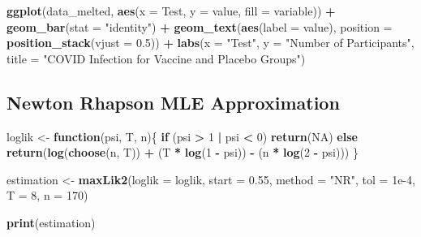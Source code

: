 \documentclass[
  11pt,
]{article}
\newenvironment{Shaded}{\begin{snugshade}}{\end{snugshade}}
\newcommand{\AttributeTok}[1]{\textcolor[rgb]{0.13,0.29,0.53}{#1}}
\newcommand{\ConstantTok}[1]{\textcolor[rgb]{0.56,0.35,0.01}{#1}}
\newcommand{\ControlFlowTok}[1]{\textcolor[rgb]{0.13,0.29,0.53}{\textbf{#1}}}
\newcommand{\DecValTok}[1]{\textcolor[rgb]{0.00,0.00,0.81}{#1}}
\newcommand{\FloatTok}[1]{\textcolor[rgb]{0.00,0.00,0.81}{#1}}
\newcommand{\FunctionTok}[1]{\textcolor[rgb]{0.13,0.29,0.53}{\textbf{#1}}}
\newcommand{\NormalTok}[1]{#1}
\newcommand{\OtherTok}[1]{\textcolor[rgb]{0.56,0.35,0.01}{#1}}
\newcommand{\SpecialCharTok}[1]{\textcolor[rgb]{0.81,0.36,0.00}{\textbf{#1}}}
\newcommand{\StringTok}[1]{\textcolor[rgb]{0.31,0.60,0.02}{#1}}
\begin{document}
\begin{Shaded}
\begin{Highlighting}[]
\FunctionTok{ggplot}\NormalTok{(data\_melted, }\FunctionTok{aes}\NormalTok{(}\AttributeTok{x =}\NormalTok{ Test, }\AttributeTok{y =}\NormalTok{ value, }\AttributeTok{fill =}\NormalTok{ variable)) }\SpecialCharTok{+}
  \FunctionTok{geom\_bar}\NormalTok{(}\AttributeTok{stat =} \StringTok{"identity"}\NormalTok{) }\SpecialCharTok{+}
  \FunctionTok{geom\_text}\NormalTok{(}\FunctionTok{aes}\NormalTok{(}\AttributeTok{label =}\NormalTok{ value), }
            \AttributeTok{position =} \FunctionTok{position\_stack}\NormalTok{(}\AttributeTok{vjust =} \FloatTok{0.5}\NormalTok{)) }\SpecialCharTok{+}
  \FunctionTok{labs}\NormalTok{(}\AttributeTok{x =} \StringTok{"Test"}\NormalTok{, }\AttributeTok{y =} \StringTok{"Number of Participants"}\NormalTok{, }
       \AttributeTok{title =} \StringTok{"COVID Infection for Vaccine and Placebo Groups"}\NormalTok{) }
\end{Highlighting}
\end{Shaded}

\hypertarget{newton-rhapson-mle-approximation}{%
\subsection{Newton Rhapson MLE
Approximation}\label{newton-rhapson-mle-approximation}}

\begin{Shaded}
\begin{Highlighting}[]
\NormalTok{loglik }\OtherTok{\textless{}{-}} \ControlFlowTok{function}\NormalTok{(psi, T, n)\{}
  \ControlFlowTok{if}\NormalTok{ (psi }\SpecialCharTok{\textgreater{}} \DecValTok{1} \SpecialCharTok{|}\NormalTok{ psi }\SpecialCharTok{\textless{}} \DecValTok{0}\NormalTok{) }
    \FunctionTok{return}\NormalTok{(}\ConstantTok{NA}\NormalTok{)}
  \ControlFlowTok{else}
    \FunctionTok{return}\NormalTok{(}\FunctionTok{log}\NormalTok{(}\FunctionTok{choose}\NormalTok{(n, T)) }\SpecialCharTok{+}\NormalTok{ (T }\SpecialCharTok{*} \FunctionTok{log}\NormalTok{(}\DecValTok{1} \SpecialCharTok{{-}}\NormalTok{ psi)) }\SpecialCharTok{{-}}\NormalTok{ (n }\SpecialCharTok{*} \FunctionTok{log}\NormalTok{(}\DecValTok{2} \SpecialCharTok{{-}}\NormalTok{ psi)))}
\NormalTok{\}}

\NormalTok{estimation }\OtherTok{\textless{}{-}} \FunctionTok{maxLik2}\NormalTok{(}\AttributeTok{loglik =}\NormalTok{ loglik, }\AttributeTok{start =} \FloatTok{0.55}\NormalTok{, }\AttributeTok{method =} \StringTok{"NR"}\NormalTok{, }\AttributeTok{tol =} \FloatTok{1e{-}4}\NormalTok{, }
                      \AttributeTok{T =} \DecValTok{8}\NormalTok{, }\AttributeTok{n =} \DecValTok{170}\NormalTok{)}

\FunctionTok{print}\NormalTok{(estimation)}
\end{Highlighting}
\end{Shaded}
\end{document}
